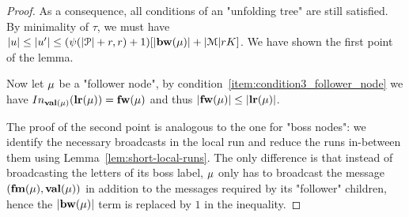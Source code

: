 \begin{proof}
	As a consequence, all conditions of an "unfolding tree" are still satisfied. 
	By minimality of $\tau$, we must have $\size{u} \leq \size{u'} \leq (\psi(\size{\prot}+r, r) +1) \Large[\size{\bosslabel{\node}}+ \size{\messages}rK\Large]$. We have shown the first point of the lemma.
	
	Now let $\mu$ be a "follower node", by condition~\ref{item:condition3_follower_node} we have $\vinput{\valuelabel{\node}}{\localrunlabel{\node}} = \followlabelword{\node}$ and thus $|\mathbf{fw}(\mu)| \leq |\mathbf{lr}(\mu)|$.
	
	The proof of the second point is analogous to the one for "boss nodes": we identify the necessary broadcasts in the local run and reduce the runs in-between them using Lemma~\ref{lem:short-local-runs}. The only difference is that instead of broadcasting the letters of its boss label, $\mu$ only has to broadcast the message $(\mathbf{fm}(\mu), \mathbf{val}(\mu))$ in addition to the messages required by its "follower" children, hence the $|\mathbf{bw}(\mu)|$ term is replaced by $1$ in the inequality.
\end{proof}

